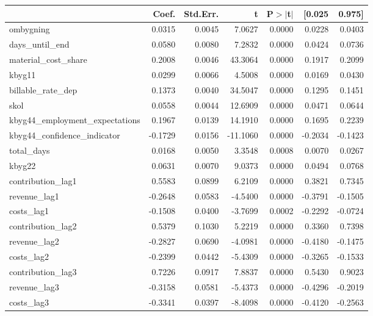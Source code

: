\begin{table}
\begin{center}
\begin{tabular}{lrrrrrr}
\hline
                                 &   Coef. & Std.Err. &        t & P$> |$t$|$ &  [0.025 &  0.975]  \\
\hline
ombygning                        &  0.0315 &   0.0045 &   7.0627 &      0.0000 &  0.0228 &  0.0403  \\
days\_until\_end                 &  0.0580 &   0.0080 &   7.2832 &      0.0000 &  0.0424 &  0.0736  \\
material\_cost\_share            &  0.2008 &   0.0046 &  43.3064 &      0.0000 &  0.1917 &  0.2099  \\
kbyg11                           &  0.0299 &   0.0066 &   4.5008 &      0.0000 &  0.0169 &  0.0430  \\
billable\_rate\_dep              &  0.1373 &   0.0040 &  34.5047 &      0.0000 &  0.1295 &  0.1451  \\
skol                             &  0.0558 &   0.0044 &  12.6909 &      0.0000 &  0.0471 &  0.0644  \\
kbyg44\_employment\_expectations &  0.1967 &   0.0139 &  14.1910 &      0.0000 &  0.1695 &  0.2239  \\
kbyg44\_confidence\_indicator    & -0.1729 &   0.0156 & -11.1060 &      0.0000 & -0.2034 & -0.1423  \\
total\_days                      &  0.0168 &   0.0050 &   3.3548 &      0.0008 &  0.0070 &  0.0267  \\
kbyg22                           &  0.0631 &   0.0070 &   9.0373 &      0.0000 &  0.0494 &  0.0768  \\
contribution\_lag1               &  0.5583 &   0.0899 &   6.2109 &      0.0000 &  0.3821 &  0.7345  \\
revenue\_lag1                    & -0.2648 &   0.0583 &  -4.5400 &      0.0000 & -0.3791 & -0.1505  \\
costs\_lag1                      & -0.1508 &   0.0400 &  -3.7699 &      0.0002 & -0.2292 & -0.0724  \\
contribution\_lag2               &  0.5379 &   0.1030 &   5.2219 &      0.0000 &  0.3360 &  0.7398  \\
revenue\_lag2                    & -0.2827 &   0.0690 &  -4.0981 &      0.0000 & -0.4180 & -0.1475  \\
costs\_lag2                      & -0.2399 &   0.0442 &  -5.4309 &      0.0000 & -0.3265 & -0.1533  \\
contribution\_lag3               &  0.7226 &   0.0917 &   7.8837 &      0.0000 &  0.5430 &  0.9023  \\
revenue\_lag3                    & -0.3158 &   0.0581 &  -5.4373 &      0.0000 & -0.4296 & -0.2019  \\
costs\_lag3                      & -0.3341 &   0.0397 &  -8.4098 &      0.0000 & -0.4120 & -0.2563  \\
\hline
\end{tabular}
\end{center}


\end{table}
